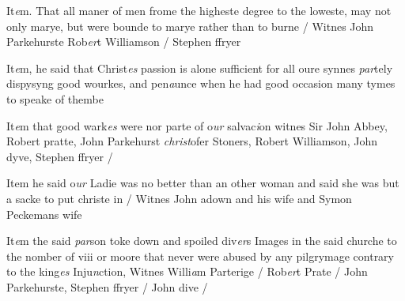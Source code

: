 \documentclass[12pt, a4paper]{book}
\begin{document}
            	
		\ifthenelse{\isodd{\thepage}}
		{\reversemarginpar}
		{\normalmarginpar}
		It\textit{e}m. That all maner of men frome the higheste degree to the
  loweste, may not only marye, but were bounde to marye
  rather than to burne / Witnes John Parkehurste
            		Rob\textit{er}t Williamson /  Stephen ffryer
            	

	
			
	
		\ifthenelse{\isodd{\thepage}}
		{\reversemarginpar}
		{\normalmarginpar}
		 It\textit{e}m, he said that Christ\textit{es} passion is alone sufficient for all
 oure synnes \textit{par}tely dispysyng good wourkes, and pen\textit{a}unce
 	when he had good occasion many tymes to speake of thembe
	
		\ifthenelse{\isodd{\thepage}}
		{\reversemarginpar}
		{\normalmarginpar}
		It\textit{e}m that good wark\textit{es} were nor parte of o\textit{ur} salvac\textit{i}on
		witnes Sir John Abbey, Robert pratte, John Parkehurst
		\textit{christ}ofer Stoners, Robert Williamson, John dyve, Stephen
		ffryer /

 
 	
			
            
			
            
		\ifthenelse{\isodd{\thepage}}
		{\reversemarginpar}
		{\normalmarginpar}
		Item he said o\textit{ur} Ladie was no better than an other woman
  and said she was but a sacke to put christe in /
  Witnes John adown and his wife and Symon
  	Peckemans wife

	
			
	
				\marginpar[\vspace{0.5cm}{\textcolor{Gray}{Images}}]{}
			
	
		\ifthenelse{\isodd{\thepage}}
		{\reversemarginpar}
		{\normalmarginpar}
		It\textit{e}m the said \textit{par}son toke down and spoiled div\textit{er}s Images
  in the said churche to the nomber of viii or moore that
 never were abused by any pilgrymage contrary to
 the king\textit{es} Inju\textit{n}ction, Witnes Willi\textit{a}m Parterige / Rob\textit{er}t
 	Prate / John Parkehurste, Stephen ffryer / John
 dive /
\end{document}
